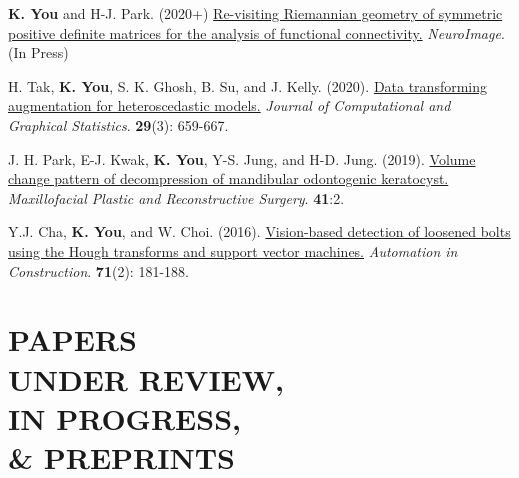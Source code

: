 \documentclass[margin, 10pt]{res} %
\begin{document}
\begin{resume}
\begin{enumerate}[label={[\arabic*]}]
	\item {\bf K. You} and H-J. Park. (2020+) \href{https://doi.org/10.1016/j.neuroimage.2020.117464}{Re-visiting Riemannian geometry of symmetric positive definite matrices for the analysis of functional connectivity.} \textit{NeuroImage}. (In Press)
	\item H. Tak, {\bf K. You}, S. K. Ghosh, B. Su, and J. Kelly. (2020). \href{https://doi.org/10.1080/10618600.2019.1704295}{Data transforming augmentation for heteroscedastic models.} {\it Journal of Computational and Graphical Statistics}. {\bf 29}(3): 659-667. 
	\item J. H. Park, E-J. Kwak, {\bf K. You}, Y-S. Jung, and H-D. Jung. (2019).
	\href{https://rdcu.be/bfKR8}{Volume change pattern of decompression of mandibular odontogenic keratocyst.} {\it Maxillofacial Plastic and Reconstructive Surgery}. {\bf 41}:2.	
	\item Y.J. Cha, {\bf K. You}, and W. Choi. (2016). \href{https://doi.org/10.1016/j.autcon.2016.06.008}{Vision-based detection of loosened bolts using the Hough transforms and support vector machines.} {\it Automation in Construction}. {\bf 71}(2): 181-188.
\end{enumerate}
\vspace{.2cm}


\section{\sf PAPERS \\ UNDER REVIEW, \\IN PROGRESS,\\ \& PREPRINTS} 


\end{resume}
\end{document}
